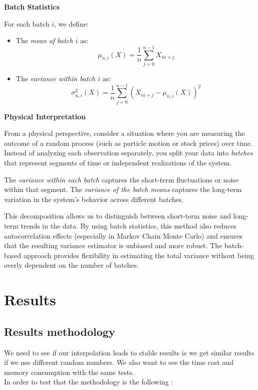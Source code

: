 \documentclass{article}
\begin{document}
\textbf{Batch Statistics}

For each batch $i$, we define:

\begin{itemize}
    \item The \textit{mean of batch $i$} as:
  \[
  \mu_{n,i}(X) = \frac{1}{n} \sum_{j=0}^{n-1} X_{ni+j}
  \]
  \item The \textit{variance within batch $i$} as:
  \[
  \sigma^2_{n,i}(X) = \frac{1}{n} \sum_{j=0}^{n-1} (X_{ni+j} - \mu_{n,i}(X))^2
  \]
\end{itemize}


\textbf{Physical Interpretation}

From a physical perspective, consider a situation where you are measuring the outcome of a random process (such as particle motion or stock prices) over time. Instead of analyzing each observation separately, you split your data into \textit{batches} that represent segments of time or independent realizations of the system.

The \textit{variance within each batch} captures the short-term fluctuations or noise within that segment.
The \textit{variance of the batch means} captures the long-term variation in the system's behavior across different batches.

This decomposition allows us to distinguish between short-term noise and long-term trends in the data. By using batch statistics, this method also reduces autocorrelation effects (especially in Markov Chain Monte Carlo) and ensures that the resulting variance estimator is unbiased and more robust. The batch-based approach provides flexibility in estimating the total variance without being overly dependent on the number of batches.

\section{Results}

\subsection{Results methodology}

We need to see if our interpolation leads to stable results ie we get similar results if we use different random numbers. We also want to see the time cost and memory consumption with the same tests. \\

In order to test that the methodology is the following :
\end{document}
